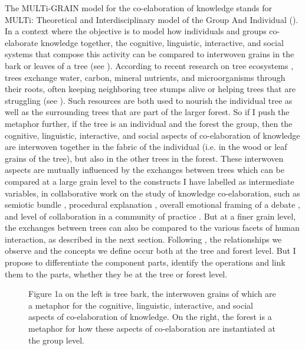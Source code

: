 \documentclass[output=paper]{langscibook}
\begin{document}
The MULTi-GRAIN model for the co-elaboration of knowledge stands for MULTi: Theoretical and Interdisciplinary model of the Group And Individual (\citealt{Lund2016,Lund2019}). In a context where the objective is to model how individuals and groups co-elaborate knowledge together, the cognitive, linguistic, interactive, and social systems that compose this activity can be compared to interwoven grains in the bark or leaves of a tree (see ). According to recent research on tree ecosystems \citep{BaderLeuzinger2019}, trees exchange water, carbon, mineral nutrients, and microorganisms through their roots, often keeping neighboring tree stumps alive or helping trees that are struggling (see ). Such resources are both used to nourish the individual tree as well as the surrounding trees that are part of the larger forest.  So if I push the metaphor further, if the tree is an individual and the forest the group, then the cognitive, linguistic, interactive, and social aspects of co-elaboration of knowledge are interwoven together in the fabric of the individual (i.e. in the wood or leaf grains of the tree), but also in the other trees in the forest. These interwoven aspects are mutually influenced by the exchanges between trees which can be compared at a large grain level to the constructs I have labelled as intermediate variables, in collaborative work on the study of knowledge co-elaboration, such as semiotic bundle \citep{LundBécu-Robinault2013}, procedural explanation \citep{Mazur-PalandreEtAl2014}, overall emotional framing of a debate \citep{PoloEtAl2016}, and level of collaboration in a community of practice \citep{EberleEtAl2013}. But at a finer grain level, the exchanges between trees can also be compared to the various facets of human interaction, as described in the next section. Following \citet{Coleman1964}, the relationships we observe and the concepts we define occur both at the tree and forest level. But I propose to differentiate the component parts, identify the operations and link them to the parts, whether they be at the tree or forest level.

\begin{figure}
\caption{Figure 1a on the left is tree bark, the interwoven grains of which are a metaphor for the cognitive, linguistic, interactive, and social aspects of co-elaboration of knowledge. On the right, the forest is a metaphor for how these aspects of co-elaboration are instantiated at the group level.}
\end{figure}
\end{document}
